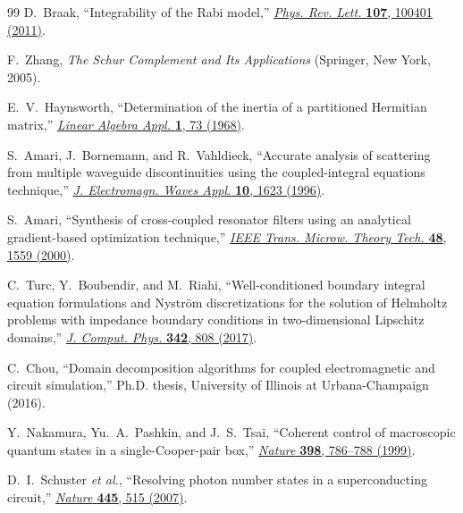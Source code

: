 \documentclass[reprint, floatfix, superscriptaddress, amsmath, amssymb, longbibliography]{revtex4-2}
\begin{document}
\begin{thebibliography}{99}
D.~Braak, ``Integrability of the Rabi model,''
\href{https://doi.org/10.1103/PhysRevLett.107.100401}{\textit{Phys. Rev. Lett.} \textbf{107}, 100401 (2011)}.

F.~Zhang,
\textit{The Schur Complement and Its Applications}
(Springer, New York, 2005).

E.~V.~Haynsworth, ``Determination of the inertia of a partitioned Hermitian matrix,'' 
\href{https://doi.org/10.1016/0024-3795(68)90050-5}{\textit{Linear Algebra Appl.} \textbf{1}, 73 (1968)}.

S.~Amari, J.~Bornemann, and R.~Vahldieck, ``Accurate analysis of scattering from multiple waveguide discontinuities using the coupled-integral equations technique,'' 
\href{https://doi.org/10.1163/156939396X00351}{\textit{J. Electromagn. Waves Appl.} \textbf{10}, 1623 (1996)}.

S.~Amari, ``Synthesis of cross-coupled resonator filters using an analytical gradient-based optimization technique,''
\href{https://doi.org/10.1109/22.798001}{\textit{IEEE Trans. Microw. Theory Tech.} \textbf{48}, 1559 (2000)}.

C.~Turc, Y.~Boubendir, and M.~Riahi, ``Well-conditioned boundary integral equation formulations and Nystr\"{o}m discretizations for the solution of Helmholtz problems with impedance boundary conditions in two-dimensional Lipschitz domains,''
\href{https://doi.org/10.1016/j.jcp.2017.05.017}{\textit{J. Comput. Phys.} \textbf{342}, 808 (2017)}.

C.~Chou, ``Domain decomposition algorithms for coupled electromagnetic and circuit simulation,''
Ph.D. thesis, University of Illinois at Urbana-Champaign (2016).

Y.~Nakamura, Yu.~A.~Pashkin, and J.~S.~Tsai,
``Coherent control of macroscopic quantum states in a single-Cooper-pair box,''
\href{https://doi.org/10.1038/19718}{\textit{Nature} \textbf{398}, 786--788 (1999)}.

D.~I.~Schuster \textit{et al.}, ``Resolving photon number states in a superconducting circuit,'' 
\href{https://doi.org/10.1038/nature05461}{\textit{Nature} \textbf{445}, 515 (2007)}.


\end{thebibliography}
\end{document}
